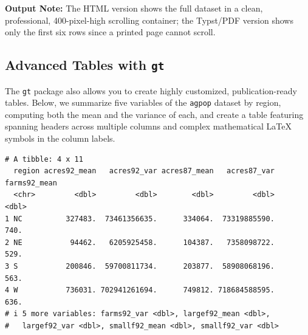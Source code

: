 \documentclass[
  letterpaper,
  DIV=11,
  numbers=noendperiod]{scrreprt}
\renewcommand{\[}{\begin{equation}}
\renewcommand{\]}{\end{equation}}
\begin{document}
\textbf{Output Note:} The HTML version shows the full dataset in a
clean, professional, 400-pixel-high scrolling container; the Typst/PDF
version shows only the first six rows since a printed page cannot
scroll.

\subsection{\texorpdfstring{Advanced Tables with
\texttt{gt}}{Advanced Tables with gt}}\label{advanced-tables-with-gt}

The \texttt{gt} package also allows you to create highly customized,
publication-ready tables. Below, we summarize five variables of the
\texttt{agpop} dataset by region, computing both the mean and the
variance of each, and create a table featuring spanning headers across
multiple columns and complex mathematical LaTeX symbols in the column
labels.

\begin{verbatim}
# A tibble: 4 x 11
  region acres92_mean   acres92_var acres87_mean   acres87_var farms92_mean
  <chr>         <dbl>         <dbl>        <dbl>         <dbl>        <dbl>
1 NC          327483.  73461356635.      334064.  73319885590.         740.
2 NE           94462.   6205925458.      104387.   7358098722.         529.
3 S           200846.  59700811734.      203877.  58908068196.         563.
4 W           736031. 702941261694.      749812. 718684588595.         636.
# i 5 more variables: farms92_var <dbl>, largef92_mean <dbl>,
#   largef92_var <dbl>, smallf92_mean <dbl>, smallf92_var <dbl>
\end{verbatim}
\end{document}
